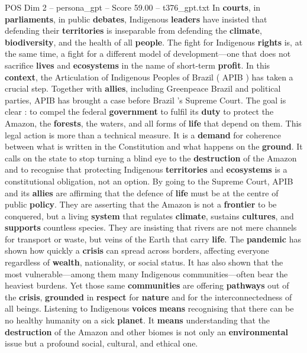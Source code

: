 \begin{textsample}{POS Dim 2 – persona\_gpt – Score 59.00 – t376\_gpt.txt}
In \textbf{courts}, in \textbf{parliaments}, in public \textbf{debates}, Indigenous \textbf{leaders} have insisted that defending their \textbf{territories} is inseparable from defending the \textbf{climate}, \textbf{biodiversity}, and the health of all \textbf{people}.
The fight for Indigenous \textbf{rights} is, at the same time, a fight for a different model of development—one that does not sacrifice \textbf{lives} and \textbf{ecosystems} in the name of short-term \textbf{profit}.
In this \textbf{context}, the Articulation of Indigenous Peoples of Brazil ( APIB ) has taken a crucial step.
Together with \textbf{allies}, including Greenpeace Brazil and political parties, APIB has brought a case before Brazil ’s Supreme Court.
The goal is clear : to compel the federal \textbf{government} to fulfil its \textbf{duty} to protect the Amazon, the \textbf{forests}, the waters, and all forms of \textbf{life} that depend on them.
This legal action is more than a technical measure.
It is a \textbf{demand} for coherence between what is written in the Constitution and what happens on the \textbf{ground}.
It calls on the state to stop turning a blind eye to the \textbf{destruction} of the Amazon and to recognise that protecting Indigenous \textbf{territories} and \textbf{ecosystems} is a constitutional obligation, not an option.
By going to the Supreme Court, APIB and its \textbf{allies} are affirming that the defence of \textbf{life} must be at the centre of public \textbf{policy}.
They are asserting that the Amazon is not a \textbf{frontier} to be conquered, but a living \textbf{system} that regulates \textbf{climate}, sustains \textbf{cultures}, and \textbf{supports} countless species.
They are insisting that rivers are not mere channels for transport or waste, but veins of the Earth that carry \textbf{life}.
The \textbf{pandemic} has shown how quickly a \textbf{crisis} can spread across borders, affecting everyone regardless of \textbf{wealth}, nationality, or social status.
It has also shown that the most vulnerable—among them many Indigenous communities—often bear the heaviest burdens.
Yet those same \textbf{communities} are offering \textbf{pathways} out of the \textbf{crisis}, \textbf{grounded} in \textbf{respect} for \textbf{nature} and for the interconnectedness of all beings.
Listening to Indigenous \textbf{voices} \textbf{means} recognising that there can be no healthy humanity on a sick \textbf{planet}.
It \textbf{means} understanding that the \textbf{destruction} of the Amazon and other biomes is not only an \textbf{environmental} issue but a profound social, cultural, and ethical one.

\end{textsample}
